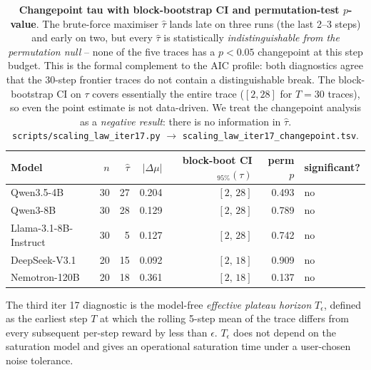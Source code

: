 \documentclass{article}
\providecommand{\eps}{\ensuremath{\epsilon}}
\begin{document}
\begin{table}[t]
  \centering
  \small
  \begin{tabular}{lrrrrrl}
    \toprule
    Model & $n$ & $\hat\tau$ & $|\Delta\mu|$ &
           block-boot CI$_{95\%}(\tau)$ &
           perm $p$ & significant? \\
    \midrule
    Qwen3.5-4B            & 30 & 27 & 0.204 & $[2,\,28]$  & 0.493 & no \\
    Qwen3-8B              & 30 & 28 & 0.129 & $[2,\,28]$  & 0.789 & no \\
    Llama-3.1-8B-Instruct & 30 &  5 & 0.127 & $[2,\,28]$  & 0.742 & no \\
    DeepSeek-V3.1         & 20 & 15 & 0.092 & $[2,\,18]$  & 0.909 & no \\
    Nemotron-120B         & 20 & 18 & 0.361 & $[2,\,18]$  & 0.137 & no \\
    \bottomrule
  \end{tabular}
  \caption{\textbf{Changepoint tau with block-bootstrap CI and
    permutation-test $p$-value}.  The brute-force maximiser
    $\hat\tau$ lands late on three runs (the last 2--3 steps)
    and early on two, but every $\hat\tau$ is
    statistically \emph{indistinguishable from the permutation
    null} -- none of the five traces has a
    $p < 0.05$ changepoint at this step budget.  This is the
    formal complement to the AIC profile: both diagnostics agree
    that the 30-step frontier traces do not contain a
    distinguishable break.  The block-bootstrap CI on $\tau$
    covers essentially the entire trace ($[2, 28]$ for $T = 30$
    traces), so even the point estimate is not data-driven.  We
    treat the changepoint analysis as a \emph{negative result}:
    there is no information in $\hat\tau$.
    \texttt{scripts/scaling\_law\_iter17.py} $\to$
    \texttt{scaling\_law\_iter17\_changepoint.tsv}.}
  \label{tab:scaling-iter17-changepoint}
\end{table}

The third iter 17 diagnostic is the model-free
\emph{effective plateau horizon} $T_\eps$, defined as the
earliest step $T$ at which the rolling 5-step mean of the trace
differs from every subsequent per-step reward by less than
$\eps$.  $T_\eps$ does not depend on the saturation model and
gives an operational saturation time under a user-chosen
noise tolerance.
\end{document}
